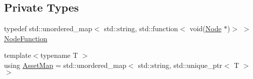 \subsection*{Private Types}
\begin{DoxyCompactItemize}
\item 
typedef std\+::unordered\+\_\+map$<$ std\+::string, std\+::function$<$ void(\hyperlink{class_asset_manager_1_1_node}{Node} $\ast$)$>$ $>$ \hyperlink{class_asset_manager_a681158dc461420e008e0f88312bf10e9}{Node\+Function}
\item 
{\footnotesize template$<$typename T $>$ }\\using \hyperlink{class_asset_manager_a67ef2a74c058b6cebefd838bcc3a7d96}{Asset\+Map} = std\+::unordered\+\_\+map$<$ std\+::string, std\+::unique\+\_\+ptr$<$ T $>$ $>$
\end{DoxyCompactItemize}
